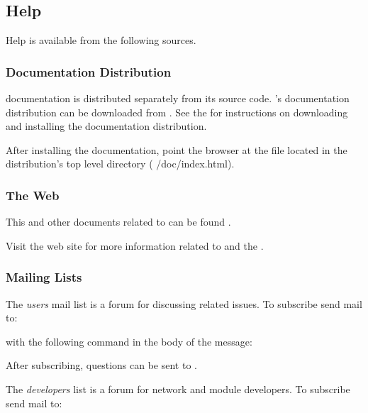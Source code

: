 \subsection{Help}
\label{sec:help}

Help is available from the following sources.

\subsubsection{Documentation Distribution}

\sr{} documentation is distributed separately from its source code.
\sr{}'s documentation distribution can be downloaded from
.  See the 
for instructions on downloading and installing the documentation
distribution.

After installing the documentation, point the browser at the
 file located in the distribution's top level
 directory (\ie{} /doc/index.html).

\subsubsection{The Web}

This and other documents related to \sr{} can be found 
.

Visit the \sci{} web site for more
information related to \sr{} and the \scii{}.

\subsubsection{Mailing Lists}

The \sr{} \emph{users} mail list is a forum for discussing \sr{}
related issues.  To subscribe send mail to:


with the following command in the body of the message:


After subscribing,  questions can be sent to
.

The \sr{} \emph{developers} list is a forum for network and module
developers.  To subscribe send mail to:


